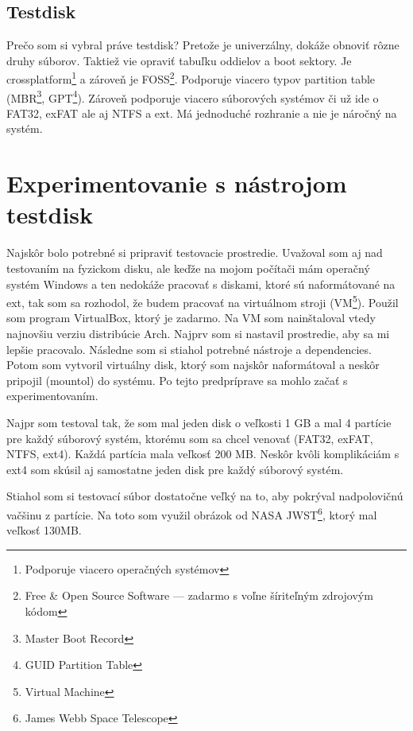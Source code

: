\documentclass[12pt,oneside,slovak,a4paper]{article}
\begin{document}
\subsection{Testdisk}
Prečo som si vybral práve testdisk? Pretože je univerzálny, dokáže obnoviť rôzne druhy súborov. Taktiež vie opraviť tabuľku oddielov a boot sektory. Je crossplatform\footnote{Podporuje viacero operačných systémov} a zároveň je FOSS\footnote{Free \& Open Source Software --- zadarmo s voľne šíriteľným zdrojovým kódom}. Podporuje viacero typov partition table (MBR\footnote{Master Boot Record}, GPT\footnote{GUID Partition Table}). Zároveň podporuje viacero súborových systémov či už ide o FAT32, exFAT ale aj NTFS a ext. Má jednoduché rozhranie a nie je náročný na systém.


\section{Experimentovanie s nástrojom testdisk}


Najskôr bolo potrebné si pripraviť testovacie prostredie. Uvažoval som aj nad testovaním na fyzickom disku, ale keďže na mojom počítači mám operačný systém Windows a ten nedokáže pracovať s diskami, ktoré sú naformátované na ext, tak som sa rozhodol, že budem pracovať na virtuálnom stroji (VM\footnote{Virtual Machine}). Použil som program VirtualBox, ktorý je zadarmo. Na VM som nainštaloval vtedy najnovšiu verziu distribúcie Arch. Najprv som si nastavil prostredie, aby sa mi lepšie pracovalo. Následne som si stiahol potrebné nástroje a dependencies. Potom som vytvoril virtuálny disk, ktorý som najskôr naformátoval a neskôr pripojil (mountol) do systému. Po tejto predpríprave sa mohlo začať s experimentovaním.

Najpr som testoval tak, že som mal jeden disk o veľkosti 1 GB a mal 4 partície pre každý súborový systém, ktorému som sa chcel venovať (FAT32, exFAT, NTFS, ext4). Každá partícia mala veľkosť 200 MB. Neskôr kvôli komplikáciám s ext4 som skúsil aj samostatne jeden disk pre každý súborový systém.

Stiahol som si testovací súbor dostatočne veľký na to, aby pokrýval nadpolovičnú vačšinu z partície. Na toto som využil obrázok od NASA JWST\footnote{James Webb Space Telescope}, ktorý mal veľkosť 130MB.
\end{document}
